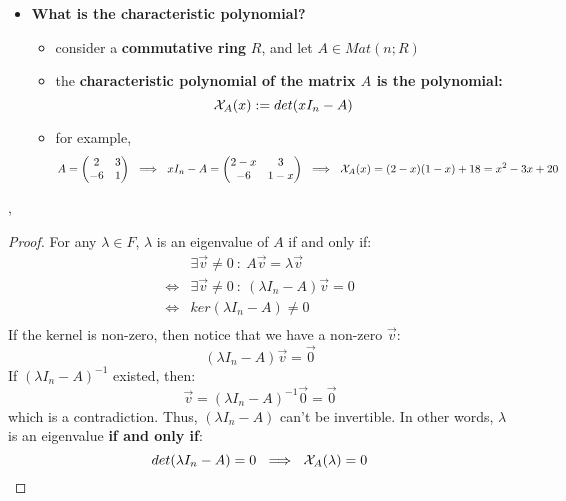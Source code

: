 \documentclass{exam}
\begin{document}
\begin{itemize}
    \item \textbf{What is the characteristic polynomial?}
    \begin{itemize}
        \item consider a \textbf{commutative ring} $R$, and let $A \in Mat(n;R)$
        \item the \textbf{characteristic polynomial of the matrix $A$ is the polynomial:}
        \[
        \mathcal{X}_A(x) := det(xI_n - A)
        \]
        \item for example,
        \[
        A = \begin{pmatrix}
        2 & 3 \\
        -6 & 1
        \end{pmatrix}
        \ \implies \
        xI_n - A = \begin{pmatrix}
        2-x & 3 \\
        -6 & 1-x
        \end{pmatrix}
        \ \implies \
        \mathcal{X}_A(x) = (2-x)(1 - x) + 18 = x^2 - 3x + 20
        \]
    \end{itemize}
\end{itemize}

\sep 


\begin{proof}

For any $\lambda \in F$, $\lambda$ is an eigenvalue of $A$ if and only if:
\begin{align*}
    &\exists \vec{v} \neq 0 \ : \ A\vec{v} = \lambda \vec{v} \\
    \iff &\exists \vec{v} \neq 0 \ : \ (\lambda I_n - A)\vec{v} = 0 \\
    \iff & ker(\lambda I_n - A) \neq 0\\
\end{align*}
If the kernel is non-zero, then notice that we have a non-zero $\vec{v}$:
\[
(\lambda I_n - A)\vec{v} = \vec{0}
\]
If $(\lambda I_n - A)^{-1}$ existed, then:
\[
\vec{v} = (\lambda I_n - A)^{-1}\vec{0} = \vec{0}
\]
which is a contradiction. Thus, $(\lambda I_n - A)$ can't be invertible. In other words, $\lambda$ is an eigenvalue \textbf{if and only if}:
\[
det(\lambda I_n - A) = 0 \ \implies \ \X_A(\lambda) = 0
\]

\end{proof}
\end{document}
